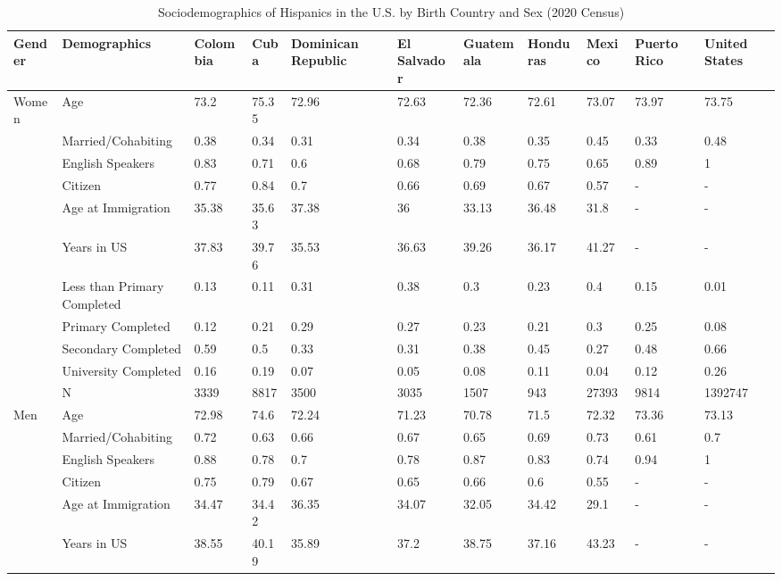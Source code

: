 \documentclass[
]{article}
\begin{document}
\begin{landscape}
\newpage

\begin{table}[ht]
\centering
\caption{Sociodemographics of Hispanics in the U.S. by Birth Country and Sex (2020 Census)} 
\begingroup\small
\begin{tabular}{l|l|lllllllll}
  \hline
Gender & Demographics & Colombia & Cuba & Dominican Republic & El Salvador & Guatemala & Honduras & Mexico & Puerto Rico & United States \\ 
  \hline
Women & Age & 73.2 & 75.35 & 72.96 & 72.63 & 72.36 & 72.61 & 73.07 & 73.97 & 73.75 \\ 
   & Married/Cohabiting & 0.38 & 0.34 & 0.31 & 0.34 & 0.38 & 0.35 & 0.45 & 0.33 & 0.48 \\ 
   & English Speakers & 0.83 & 0.71 & 0.6 & 0.68 & 0.79 & 0.75 & 0.65 & 0.89 & 1 \\ 
   & Citizen & 0.77 & 0.84 & 0.7 & 0.66 & 0.69 & 0.67 & 0.57 & - & - \\ 
   & Age at Immigration & 35.38 & 35.63 & 37.38 & 36 & 33.13 & 36.48 & 31.8 & - & - \\ 
   & Years in US & 37.83 & 39.76 & 35.53 & 36.63 & 39.26 & 36.17 & 41.27 & - & - \\ 
   & Less than Primary Completed & 0.13 & 0.11 & 0.31 & 0.38 & 0.3 & 0.23 & 0.4 & 0.15 & 0.01 \\ 
   & Primary Completed & 0.12 & 0.21 & 0.29 & 0.27 & 0.23 & 0.21 & 0.3 & 0.25 & 0.08 \\ 
   & Secondary Completed & 0.59 & 0.5 & 0.33 & 0.31 & 0.38 & 0.45 & 0.27 & 0.48 & 0.66 \\ 
   & University Completed & 0.16 & 0.19 & 0.07 & 0.05 & 0.08 & 0.11 & 0.04 & 0.12 & 0.26 \\ 
   & N & 3339 & 8817 & 3500 & 3035 & 1507 & 943 & 27393 & 9814 & 1392747 \\ 
  Men & Age & 72.98 & 74.6 & 72.24 & 71.23 & 70.78 & 71.5 & 72.32 & 73.36 & 73.13 \\ 
   & Married/Cohabiting & 0.72 & 0.63 & 0.66 & 0.67 & 0.65 & 0.69 & 0.73 & 0.61 & 0.7 \\ 
   & English Speakers & 0.88 & 0.78 & 0.7 & 0.78 & 0.87 & 0.83 & 0.74 & 0.94 & 1 \\ 
   & Citizen & 0.75 & 0.79 & 0.67 & 0.65 & 0.66 & 0.6 & 0.55 & - & - \\ 
   & Age at Immigration & 34.47 & 34.42 & 36.35 & 34.07 & 32.05 & 34.42 & 29.1 & - & - \\ 
   & Years in US & 38.55 & 40.19 & 35.89 & 37.2 & 38.75 & 37.16 & 43.23 & - & - \\ 

\end{tabular}
\end{table}
\end{landscape}
\end{document}

